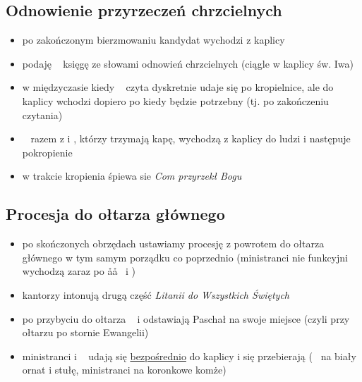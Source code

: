 \subsection{Odnowienie przyrzeczeń chrzcielnych}
\begin{itemize}
	\item po zakończonym bierzmowaniu kandydat wychodzi z kaplicy
	\item {} podaję \ii~ księgę ze słowami odnowień chrzcielnych (ciągle w
	      kaplicy św. Iwa)
	\item w międzyczasie kiedy \ii~ czyta  dyskretnie udaje się po
	      kropielnice, ale do kaplicy wchodzi dopiero po kiedy będzie potrzebny
	      (tj. po zakończeniu czytania)
	\item \ii~ razem z  i , którzy trzymają kapę, wychodzą z kaplicy do
	      ludzi i następuje pokropienie
	\item w trakcie kropienia śpiewa sie \textit{Com przyrzekł Bogu}
\end{itemize}
\subsection{Procesja do ołtarza głównego} 
\begin{itemize}
	\item po skończonych obrzędach ustawiamy procesję z powrotem do ołtarza
	      głównego w tym samym porządku co poprzednio (ministranci nie funkcyjni
	      wychodzą zaraz po \aa\aa~ i )
	\item kantorzy intonują drugą część \textit{Litanii do Wszystkich Świętych}
	\item po przybyciu do ołtarza \mm~ i  odstawiają Paschał na swoje
	      miejsce (czyli przy ołtarzu po stornie Ewangelii)
	\item ministranci i \ii~ udają się \underline{bezpośrednio} do kaplicy i się
	      przebierają (\ii~ na biały ornat i stułę, ministranci na koronkowe
	      komże)
\end{itemize}
